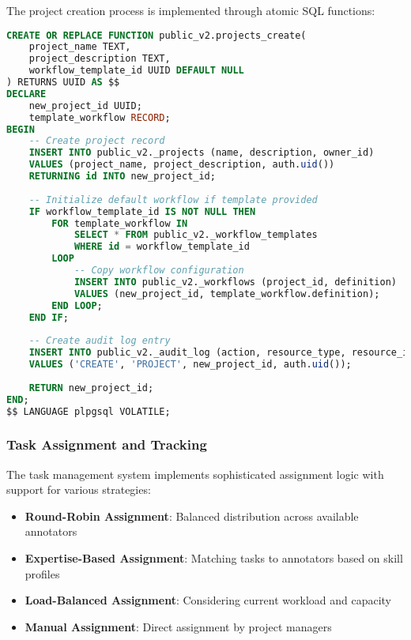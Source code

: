 The project creation process is implemented through atomic SQL functions:

\begin{lstlisting}[language=sql, caption=Project Creation Function]
CREATE OR REPLACE FUNCTION public_v2.projects_create(
    project_name TEXT,
    project_description TEXT,
    workflow_template_id UUID DEFAULT NULL
) RETURNS UUID AS $$
DECLARE
    new_project_id UUID;
    template_workflow RECORD;
BEGIN
    -- Create project record
    INSERT INTO public_v2._projects (name, description, owner_id)
    VALUES (project_name, project_description, auth.uid())
    RETURNING id INTO new_project_id;
    
    -- Initialize default workflow if template provided
    IF workflow_template_id IS NOT NULL THEN
        FOR template_workflow IN 
            SELECT * FROM public_v2._workflow_templates 
            WHERE id = workflow_template_id
        LOOP
            -- Copy workflow configuration
            INSERT INTO public_v2._workflows (project_id, definition)
            VALUES (new_project_id, template_workflow.definition);
        END LOOP;
    END IF;
    
    -- Create audit log entry
    INSERT INTO public_v2._audit_log (action, resource_type, resource_id, user_id)
    VALUES ('CREATE', 'PROJECT', new_project_id, auth.uid());
    
    RETURN new_project_id;
END;
$$ LANGUAGE plpgsql VOLATILE;
\end{lstlisting}

\subsubsection{Task Assignment and Tracking}

The task management system implements sophisticated assignment logic with support for various strategies:

\begin{itemize}
    \item \textbf{Round-Robin Assignment}: Balanced distribution across available annotators
    \item \textbf{Expertise-Based Assignment}: Matching tasks to annotators based on skill profiles
    \item \textbf{Load-Balanced Assignment}: Considering current workload and capacity
    \item \textbf{Manual Assignment}: Direct assignment by project managers
\end{itemize}

